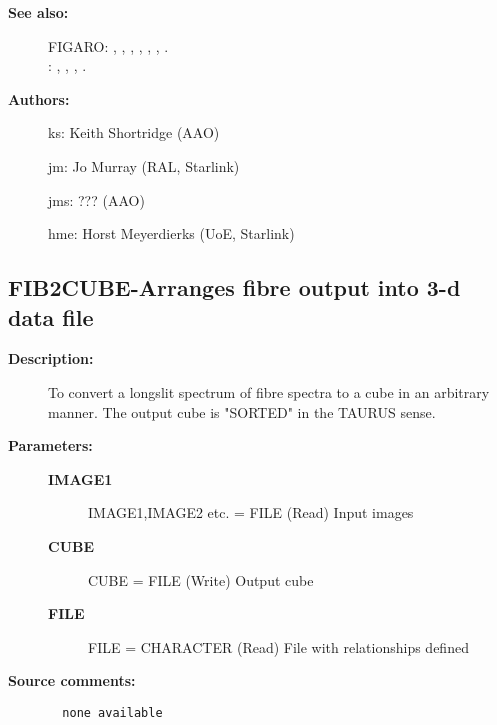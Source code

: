 \begin{description}
\item [{\bf See also:}]
FIGARO: , , , , , , .\\
: , , , .\\

\item [{\bf Authors:}]
 ks: Keith Shortridge (AAO)

 jm: Jo Murray (RAL, Starlink)

 jms: ??? (AAO)

 hme: Horst Meyerdierks (UoE, Starlink)

\end{description}
\subsection{FIB2CUBE-\label{FIB2CUBE}Arranges fibre output into 3-d data file}
\begin{description}

\item [{\bf Description:}]
  To convert a longslit spectrum of fibre spectra to a cube in an
 arbitrary manner. The output cube is "SORTED" in the TAURUS sense.

\item [{\bf Parameters:}]
\begin{description}
\item [{\bf IMAGE1}]
   IMAGE1,IMAGE2 etc. = FILE (Read)
        Input images
\item [{\bf CUBE}]
   CUBE = FILE (Write)
        Output cube
\item [{\bf FILE}]
   FILE = CHARACTER (Read)
        File with relationships defined
\end{description}

\item [{\bf Source comments:}]
\begin{verbatim}
  none available

\end{verbatim}
\end{description}

